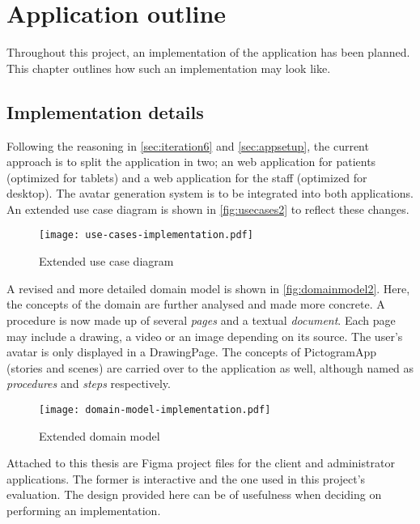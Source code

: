 \chapter{Application outline}
\label{ch:outline}

Throughout this project, an implementation of the application has been planned. This chapter outlines how such an implementation may look like.

\section{Implementation details}

Following the reasoning in \autoref{sec:iteration6} and \autoref{sec:appsetup}, the current approach is to split the application in two; an web application for patients (optimized for tablets) and a web application for the staff (optimized for desktop). The avatar generation system is to be integrated into both applications. An extended use case diagram is shown in \autoref{fig:usecases2} to reflect these changes.

\begin{figure}
    \centering
    \texttt{[image: use-cases-implementation.pdf]}
    \caption{Extended use case diagram}
    \label{fig:usecases2}
\end{figure}

A revised and more detailed domain model is shown in \autoref{fig:domainmodel2}. Here, the concepts of the domain are further analysed and made more concrete. A procedure is now made up of several \emph{pages} and a textual \emph{document}. Each page may include a drawing, a video or an image depending on its source. The user's avatar is only displayed in a DrawingPage. The concepts of PictogramApp (stories and scenes) are carried over to the application as well, although named as \emph{procedures} and \emph{steps} respectively.

\begin{figure}
    \centering
    \texttt{[image: domain-model-implementation.pdf]}
    \caption{Extended domain model}
    \label{fig:domainmodel2}
\end{figure}

Attached to this thesis are Figma project files for the client and administrator applications. The former is interactive and the one used in this project's evaluation. The design provided here can be of usefulness when deciding on performing an implementation.

